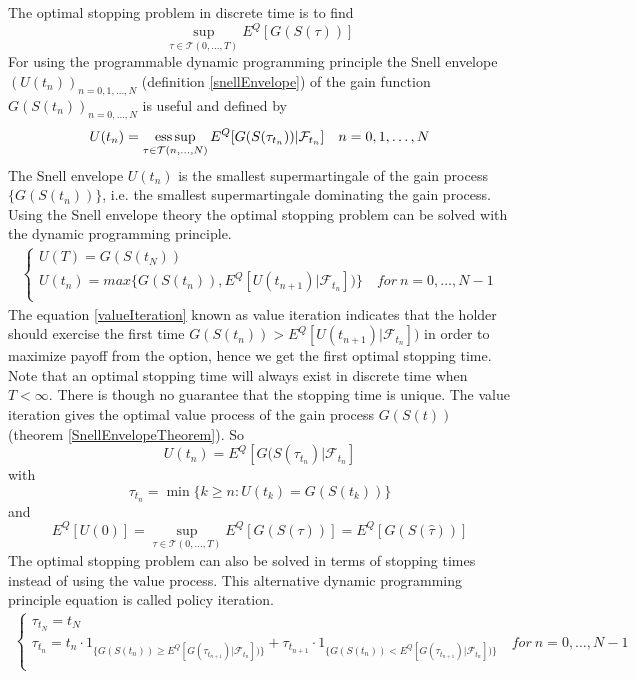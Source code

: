 The optimal stopping problem in discrete time is to find
\begin{equation}\label{Bermudanstop1}
\sup_{\tau \in \mathcal{T}(0,\ldots,T)} E^Q[G(S(\tau))]
\end{equation}
For using the programmable dynamic programming principle the Snell envelope $(U(t_{n}))_{n=0,1,\ldots, N}$ (definition \ref{snellEnvelope}) of the gain function $G(S(t_n))_{n=0,\ldots,N}$ is useful and defined by
$$U(t_n)=\operatorname*{ess\,sup}_{\tau \in \mathcal{T}(n,\ldots, N)} E^Q[G(S(\tau_{t_n}))|\mathcal{F}_{t_n}] \quad n=0,1, \ldots, N$$
The Snell envelope $U(t_n)$ is the smallest supermartingale of the gain process $\{G(S(t_n))\}$, i.e. the smallest supermartingale dominating the gain process. Using the Snell envelope theory the optimal stopping problem can be solved with the dynamic programming principle.
\begin{equation}\label{valueIteration}
\begin{split}
\begin{cases}
          U(T) = G(S(t_N))\\
          U(t_n) = max\{ G(S(t_n)), E^Q[U(t_{n+1})|\mathcal{F}_{t_n}])\} \quad for \ n={0,\ldots,N-1} \\ 
\end{cases}
\end{split}
\end{equation}
The equation \eqref{valueIteration} known as value iteration indicates that the holder should exercise the first time $G(S(t_n))> E^Q[U(t_{n+1})|\mathcal{F}_{t_n}])$ in order to maximize payoff from the option, hence we get the first optimal stopping time. Note that an optimal stopping time will always exist in discrete time when $T<\infty$. There is though no guarantee that the stopping time is unique. The value iteration gives the optimal value process of the gain process $G(S(t))$ (theorem \ref{SnellEnvelopeTheorem}). So 
$$U(t_n)=E^Q[G(S(\tau_{t_n})|\mathcal{F}_{t_n}]$$ with 
$$\tau_{t_n}=\min \{ k \geq n : U(t_k)=G(S(t_k)) \}$$ and 
$$E^Q[U(0)]= \sup_{\tau \in \mathcal{T}(0,\ldots, T)} E^Q[G(S(\tau))]=E^Q[G(S(\hat{\tau}))]$$ 
The optimal stopping problem can also be solved in terms of stopping times instead of using the value process. This alternative dynamic programming principle equation is called policy iteration.
\begin{equation}\label{policyIteration}
\begin{split}
\begin{cases}
          \tau_{t_N} = t_N\\
          \tau_{t_n} = t_n \cdot 1_{\{G(S(t_n)) \geq E^Q[G(\tau_{t_{n+1}})|\mathcal{F}_{t_n}])\}} + \tau_{t_{n+1}} \cdot 1_{\{G(S(t_n)) < E^Q[G(\tau_{t_{n+1}})|\mathcal{F}_{t_n}])\}} \quad for \ n={0,\ldots,N-1} \\ 
\end{cases}
\end{split}
\end{equation}

